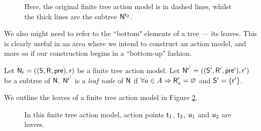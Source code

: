 \begin{figure}
	\centering
{}
	\caption[Example subtrees]{Here, the original finite tree action model is in dashed lines, whilst
	the thick lines are the subtree $\mathrm{\mathsf{N}}^{\mathrm{\mathsf{t}}_2}$.}
	\label{figure:subtreeExample}
\end{figure}

We also might need to refer to the ``bottom" elements of a tree --- its leaves.
This is clearly useful in an area where we intend to construct an action model, and more so if our
construction begins in a ``bottom-up" fashion.

\begin{defn} \label{leaf}
Let $\mathrm{\mathsf{N}}_\mathrm{\mathsf{r}} = ((\mathrm{\mathsf{S}}, \mathrm{\mathsf{R}}, \mathrm{\mathsf{pre}}), \mathrm{\mathsf{r}})$ be a finite tree action model.
Let $\mathrm{\mathsf{N}}^{\mathrm{\mathsf{r}}'} = ((\mathrm{\mathsf{S}}', \mathrm{\mathsf{R}}', \mathrm{\mathsf{pre}}'), \mathrm{\mathsf{r}}')$ be a subtree of $\mathrm{\mathsf{N}}$.
$\mathrm{\mathsf{N}}^{\mathrm{\mathsf{r}}'}$ is a {\em leaf node} of $\mathrm{\mathsf{N}}$ if $\forall a \in A \Rightarrow \mathrm{\mathsf{R}}'_a = \varnothing$ and $\mathrm{\mathsf{S}}' = \{
\mathrm{\mathsf{r}}'\}$.
\end{defn}

We outline the leaves of a finite tree action model in Figure \ref{figure:exampleLeaves}.

\begin{figure}
	\centering
{}
	\caption[Example leaves]{In this finite tree action model, action points $\mathrm{\mathsf{t}}_1$, $\mathrm{\mathsf{t}}_3$, $\mathrm{\mathsf{u}}_1$ and
	$\mathrm{\mathsf{u}}_2$ are leaves.}
	\label{figure:exampleLeaves}
\end{figure}

